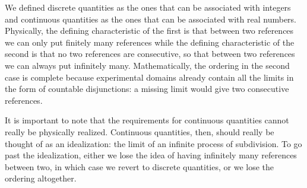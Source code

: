 We defined discrete quantities as the ones that can be associated with integers and continuous quantities as the ones that can be associated with real numbers. Physically, the defining characteristic of the first is that between two references we can only put finitely many references while the defining characteristic of the second is that no two references are consecutive, so that between two references we can always put infinitely many. Mathematically, the ordering in the second case is complete because experimental domains already contain all the limits in the form of countable disjunctions: a missing limit would give two consecutive references.

It is important to note that the requirements for continuous quantities cannot really be physically realized. Continuous quantities, then, should really be thought of as an idealization: the limit of an infinite process of subdivision. To go past the idealization, either we lose the idea of having infinitely many references between two, in which case we revert to discrete quantities, or we lose the ordering altogether.
